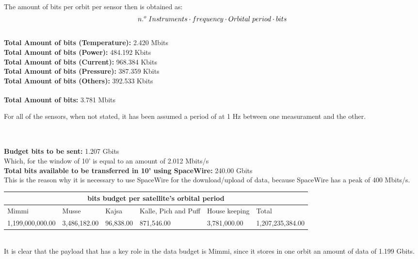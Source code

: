 \documentclass[a4paper,12pt]{article}
\begin{document}
\begin{itemize}
\begin{itemize}
\end{itemize}
\
\\
The amount of bits per orbit per sensor then is obtained as:
\\
$$n.^o \hspace{0.1 cm} Instruments \cdot frequency \cdot Orbital \hspace{0.1 cm} period \cdot bits$$
\\
\textbf{Total Amount of bits (Temperature):} 2.420 Mbits
\\
\textbf{Total Amount of bits (Power):} 484.192 Kbits
\\
\textbf{Total Amount of bits (Current):} 968.384 Kbits
\\
\textbf{Total Amount of bits (Pressure):}  387.359 Kbits
\\
\textbf{Total Amount of bits (Others):} 392.533 Kbits 
 \\
 \\
 \textbf{Total Amount of bits:} 3.781 Mbits

For all of the sensors, when not stated, it has been assumed a period of at 1 Hz between one measurament and the other.






\end{itemize}
\
\\
\\
\textbf{Budget bits to be sent:} 1.207 Gbits
\\
Which, for the window of 10' is equal to an amount of 2.012 Mbits/s
\\
\textbf{Total bits available to be transferred in 10' using SpaceWire:} 240.00 Gbits
\\
This is the reason why it is necessary to use SpaceWire for the download/upload of data, because SpaceWire has a peak of 400 Mbits/s.



\begin{tiny}
\begin{center}
\begin{tabular}{ |p{1.8cm}|p{1cm}|p{1cm}|p{1cm}|p{1cm}|p{1.8cm}|  }
\hline
\multicolumn{6}{|c|}{\textbf{bits budget per satellite's orbital period}} \\
\hline
Mimmi & Musse & Kajsa & Kalle, Pich and Puff &  House keeping & Total\\
\hline
 1,199,000,000.00 & 3,486,182.00 & 96,838.00 & 871,546.00 & 3,781,000.00 & 1,207,235,384.00 \\
\hline
\end{tabular}
\end{center}
\end{tiny}
\
\\
It is clear that the payload that has a key role in the data budget is Mimmi, since it stores in one orbit an amount of data of 1.199 Gbits.
\\
\newpage
\end{document}

